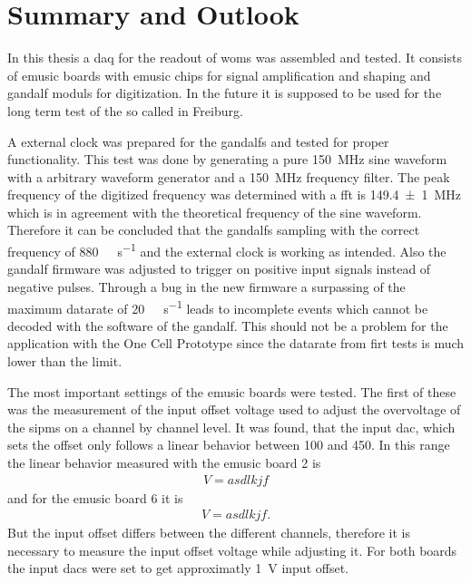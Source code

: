 \chapter{Summary and Outlook}
In this thesis a \ac{daq} for the readout of \acp{wom} was assembled and tested.
It consists of \ac{emusic} boards with \ac{emusic} chips for signal amplification and shaping and \ac{gandalf} moduls for digitization.
In the future it is supposed to be used for the long term test of the so called  in Freiburg.

A external clock was prepared for the \acp{gandalf} and tested for proper functionality.
This test was done by generating a pure \SI{150}{\mega\hertz} sine waveform with a arbitrary waveform generator and a \SI{150}{\mega\hertz} frequency filter.
The peak frequency of the digitized frequency was determined with a \ac{fft} is \SI{149.4(10)}{\mega\hertz} which is in agreement with the theoretical frequency of the sine waveform.
Therefore it can be concluded that the \acp{gandalf} sampling with the correct frequency of \SI{880}{\mega\sample\per\second} and the external clock is working as intended.
Also the \ac{gandalf} firmware was adjusted to trigger on positive input signals instead of negative pulses.
Through a bug in the new firmware a surpassing of the maximum datarate of \SI{20}{\mega\byte\per\second} leads to incomplete events which cannot be decoded with the software of the \ac{gandalf}.
This should not be a problem for the application with the One Cell Prototype since the datarate from firt tests is much lower than the limit.

The most important settings of the \ac{emusic} boards were tested.
The first of these was the measurement of the input offset voltage used to adjust the overvoltage of the \acp{sipm} on a channel by channel level.
It was found, that the input \ac{dac}, which sets the offset only follows a linear behavior between \SI{100}{\dacu} and \SI{450}{\dacu}.
In this range the linear behavior measured with the \ac{emusic} board 2 is
\begin{align}
	V = asdlkjf
\end{align}
and for the \ac{emusic} board 6 it is
\begin{align}
	V = asdlkjf.
\end{align}
But the input offset differs between the different channels, therefore it is necessary to measure the input offset voltage while adjusting it.
For both boards the input \acp{dac} were set to get approximatly \SI{1}{\volt} input offset.

